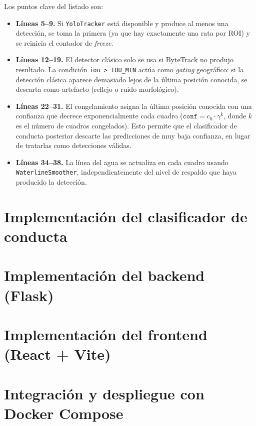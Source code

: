 Los puntos clave del listado son:

\begin{itemize}
    \item \textbf{Líneas 5--9.} Si \texttt{YoloTracker} está disponible y
    produce al menos una detección, se toma la primera (ya que hay exactamente
    una rata por ROI) y se reinicia el contador de \textit{freeze}.

    \item \textbf{Líneas 12--19.} El detector clásico solo se usa si
    ByteTrack no produjo resultado. La condición \texttt{iou > IOU\_MIN}
    actúa como \textit{gating} geográfico: si la detección clásica aparece
    demasiado lejos de la última posición conocida, se descarta como
    artefacto (reflejo o ruido morfológico).

    \item \textbf{Líneas 22--31.} El congelamiento asigna la última posición
    conocida con una confianza que decrece exponencialmente cada cuadro
    ($\texttt{conf} = c_0 \cdot \gamma^{k}$, donde $k$ es el número de
    cuadros congelados). Esto permite que el clasificador de conducta posterior
    descarte las predicciones de muy baja confianza, en lugar de tratarlas
    como detecciones válidas.

    \item \textbf{Líneas 34--38.} La línea del agua se actualiza en cada
    cuadro usando \texttt{WaterlineSmoother}, independientemente del nivel
    de respaldo que haya producido la detección.
\end{itemize}

\section{Implementaci\'{o}n del clasificador de conducta}

\section{Implementaci\'{o}n del backend (Flask)}

\section{Implementaci\'{o}n del frontend (React + Vite)}

\section{Integraci\'{o}n y despliegue con Docker Compose}
